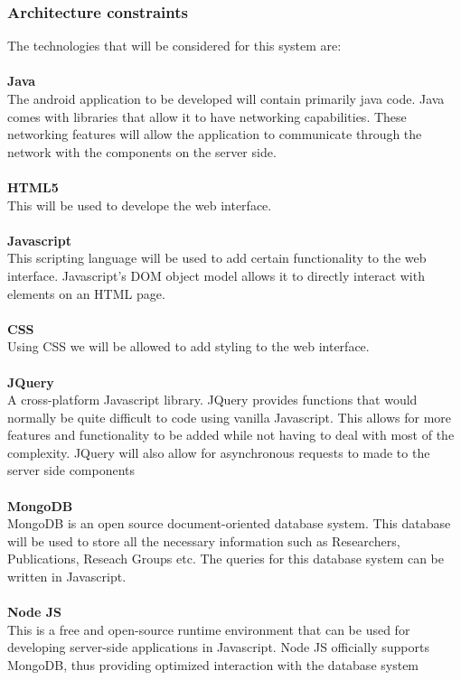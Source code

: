 \documentclass{article}
\begin{document}
	\subsubsection{Architecture constraints}
    
	The technologies that will be considered for this system are: 
	\\ \\ 
	\textbf{Java} \\
	The android application to be developed will contain primarily java code. Java comes with libraries that allow it to have networking capabilities.
	These networking features will allow the application to communicate through the network with the components on the server side. 
	\\ \\ 
	\textbf{HTML5}\\
	This will be used to develope the web interface. 
	\\ \\ 
	\textbf{Javascript}\\
	This scripting language will be used to add certain functionality to the web interface. Javascript's DOM object model allows it to directly
	interact with elements on an HTML page. 
	\\ \\
	\textbf{CSS}\\
	Using CSS we will be allowed to add styling to the web interface. 
        \\ \\ 
	\textbf{JQuery}\\
	A cross-platform Javascript library. JQuery provides functions that would normally be quite difficult to code using vanilla Javascript. This
	allows for more features and functionality to be added while not having to deal with most of the complexity. JQuery will also allow for asynchronous
	requests to made to the server side components 
	\\ \\
	\textbf{MongoDB}\\
	MongoDB is an open source document-oriented database system. This database will be used to store all the necessary information such as Researchers,
	Publications, Reseach Groups etc. The queries for this database system can be written in Javascript.
	\\ \\
	\textbf{Node JS}\\
	This is a free and open-source runtime environment that can be used for developing server-side applications in Javascript. Node JS officially supports MongoDB, thus 
	providing optimized interaction with the database system
	
\end{document}
